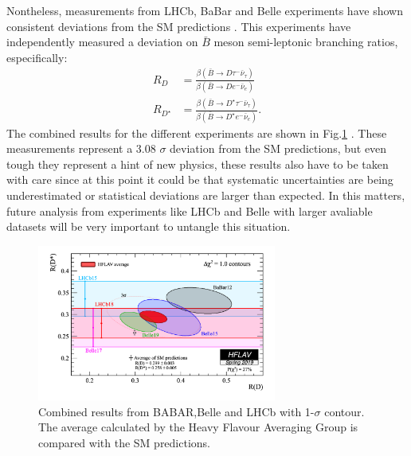 Nontheless, measurements from LHCb, BaBar and Belle experiments have shown consistent deviations from the SM predictions \cite{Ciezarek_2017}. This experiments have independently measured a deviation on $\bar{B}$ meson semi-leptonic branching ratios, especifically:
\begin{align}
	R_D&=\frac{\beta(\bar{B}\to D\tau^-\bar{\nu}_\tau)}{\beta(\bar{B}\to De^-\bar{\nu}_e)}
	\\
	R_{D^\star}&=\frac{\beta(\bar{B}\to D^\star\tau^-\bar{\nu}_\tau)}{\beta(\bar{B}\to D^\star e^-\bar{\nu}_e)}.
\end{align}
The combined results for the different experiments are shown in Fig.\ref{Fig3} . These measurements represent a 3.08 $\sigma$
 deviation from the SM predictions, but even tough they represent a hint of new physics, these results also have to be taken with care since at this point it could be that systematic uncertainties are being underestimated or statistical deviations are larger than expected. In this matters, future analysis from experiments like LHCb and Belle with larger avaliable datasets will be very important to untangle this situation.
 \begin{figure}[h]
 	\centering
 	\includegraphics[width=0.7\textwidth]{figures/Fig3}
 	\caption{Combined results from BABAR,Belle and LHCb with 1-$\sigma$ contour. The average calculated by the Heavy Flavour Averaging Group \cite{HFAG}  is compared with the SM predictions.}
 	\label{Fig3}
 \end{figure}